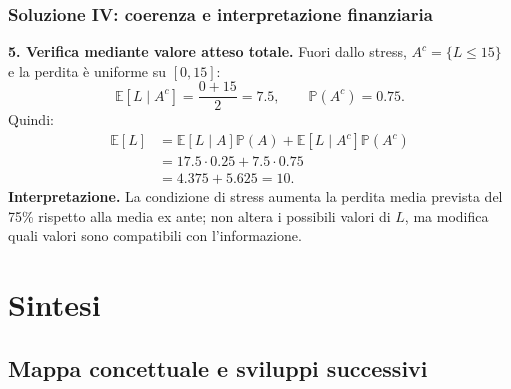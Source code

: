 \documentclass[handout]{beamer}%
\providecommand{\E}{\mathbb{E}}
\providecommand{\Prob}{\mathbb{P}}
\providecommand{\1}{\mathbf{1}}
\providecommand{\QTR}[2]{\csname #1\endcsname{#2}}
\begin{document}
\begin{frame}%
\frametitle{Soluzione IV: coerenza e interpretazione finanziaria}
%


\textbf{5. Verifica mediante valore atteso totale.} \medskip Fuori dallo
stress, $A^{c}=\{L\leq15\}$ e la perdita \`{e} uniforme su $[0,15]$:
\[
\E[L\mid A^c]=\frac{0+15}{2}=7.5, \qquad\Prob(A^{c})=0.75.
\]
Quindi:
\[
\begin{aligned}
\E[L]
&=\E[L\mid A]\Prob(A)
+\E[L\mid A^c]\Prob(A^c)\\
&=17.5\cdot0.25+7.5\cdot0.75\\
&=4.375+5.625=10.
\end{aligned}
\]
\textbf{Interpretazione.} La condizione di stress aumenta la perdita media
prevista del 75\% rispetto alla media ex ante; non altera i possibili valori
di $L$, ma modifica quali valori sono compatibili con l'informazione.%

\end{frame}%


\section{Sintesi}

\subsection{Mappa concettuale e sviluppi successivi}%
\end{document}
